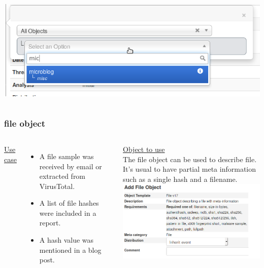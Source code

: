 \begin{frame}
\begin{columns}[totalwidth=\textwidth]
        \includegraphics[scale=0.15]{microblog.png}
\end{columns}
\end{frame}


\begin{frame}
\frametitle{file object}
\begin{columns}[totalwidth=\textwidth]
        \underline{Use case}\\
        \begin{itemize}
                \item A file sample was received by email or extracted from VirusTotal.
                \item A list of file hashes were included in a report.
                \item A hash value was mentioned in a blog post.
        \end{itemize}
        \underline{Object to use}\\
        The file object can be used to describe file. It's usual to have partial meta information such as a single hash and a filename.\\
        \includegraphics[scale=0.25]{fileobject.png}
\end{columns}
\end{frame}

